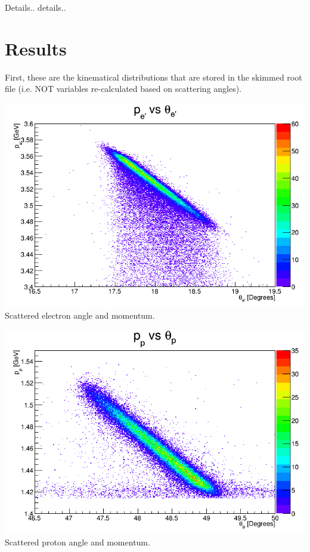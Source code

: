\documentclass{article}
\begin{document}
Details.. details..\\

\section*{Results}
First, these are the kinematical distributions that are stored in the skimmed root file (i.e. NOT variables re-calculated based on scattering angles).
\begin{center}
\includegraphics[width=15cm]{Pe_Te.png}\\
Scattered electron angle and momentum.
\end{center}

\begin{center}
\includegraphics[width=15cm]{Pp_Tp.png}\\
Scattered proton angle and momentum.
\end{center}
\end{document}
